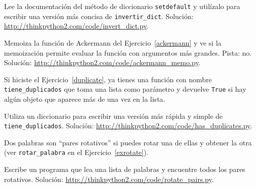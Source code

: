\documentclass[10pt]{book}
\begin{document}
\begin{exercise}
\label{setdefault}

Lee la documentación del método de diccionario {\tt setdefault}
y utilízalo para escribir una versión más concisa de \verb"invertir_dict".
Solución: \url{http://thinkpython2.com/code/invert_dict.py}.

\end{exercise}


\begin{exercise}
Memoiza la función de Ackermann del Ejercicio~\ref{ackermann} y ve si
la memoización permite evaluar la función con argumentos
más grandes.  Pista: no.
Solución: \url{http://thinkpython2.com/code/ackermann_memo.py}.

\end{exercise}



\begin{exercise}

Si hiciste el Ejercicio~\ref{duplicate}, ya tienes
una función con nombre \verb"tiene_duplicados" que toma una lista
como parámetro y devuelve {\tt True} si hay algún objeto
que aparece más de una vez en la lista.

Utiliza un diccionario para escribir una versión más rápida y simple de
\verb"tiene_duplicados".
Solución: \url{http://thinkpython2.com/code/has_duplicates.py}.

\end{exercise}


\begin{exercise}
\label{exrotatepairs}

Dos palabras son ``pares rotativos'' si puedes rotar una de ellas
y obtener la otra (ver \verb"rotar_palabra" en el Ejercicio~\ref{exrotate}).

Escribe un programa que lea una lista de palabras y encuentre todos los pares
rotativos.  Solución: \url{http://thinkpython2.com/code/rotate_pairs.py}.

\end{exercise}
\end{document}
